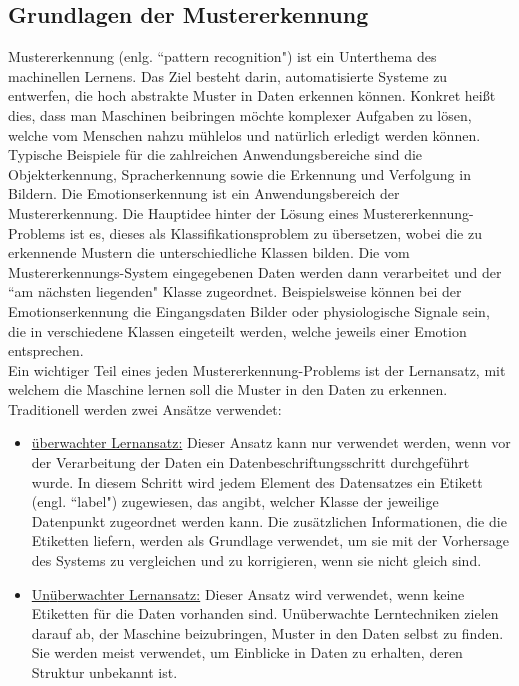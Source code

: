 \subsection{Grundlagen der Mustererkennung} \label{grundlagen-mustererkennung}


Mustererkennung (enlg. ``pattern recognition") ist ein Unterthema des machinellen Lernens.
Das Ziel besteht darin, automatisierte Systeme zu entwerfen, die hoch abstrakte Muster in Daten erkennen k{\"o}nnen.
Konkret hei{\ss}t dies, dass man Maschinen beibringen m{\"o}chte komplexer Aufgaben zu l{\"o}sen, welche vom Menschen nahzu m{\"u}hlelos und nat{\"u}rlich erledigt werden k{\"o}nnen.
Typische Beispiele f{\"u}r die zahlreichen Anwendungsbereiche sind die Objekterkennung, Spracherkennung sowie die Erkennung und Verfolgung in Bildern. 
Die Emotionserkennung ist ein Anwendungsbereich der Mustererkennung.
Die Hauptidee hinter der L{\"o}sung eines Mustererkennung-Problems ist es, dieses als Klassifikationsproblem zu {\"u}bersetzen, wobei die zu erkennende Mustern die unterschiedliche Klassen bilden. 
Die vom Mustererkennungs-System eingegebenen Daten werden dann verarbeitet und der ``am n{\"a}chsten liegenden" Klasse zugeordnet.
Beispielsweise k{\"o}nnen bei der Emotionserkennung die Eingangsdaten Bilder oder physiologische Signale sein, die in verschiedene Klassen eingeteilt werden, welche jeweils einer Emotion entsprechen. \\

Ein wichtiger Teil eines jeden Mustererkennung-Problems ist der Lernansatz, mit welchem die Maschine lernen soll die Muster in den Daten zu erkennen. 
Traditionell werden zwei Ans{\"a}tze verwendet:

\begin{itemize}%
  \item \underline{{\"u}berwachter Lernansatz:}
  Dieser Ansatz kann nur verwendet werden, wenn vor der Verarbeitung der Daten ein Datenbeschriftungsschritt durchgef{\"u}hrt wurde.
  In diesem Schritt wird jedem Element des Datensatzes ein Etikett (engl. ``label") zugewiesen, das angibt, welcher Klasse der jeweilige Datenpunkt zugeordnet werden kann.
  Die zus{\"a}tzlichen Informationen, die die Etiketten liefern, werden als Grundlage verwendet, um sie mit der Vorhersage des Systems zu vergleichen und zu korrigieren, wenn sie nicht gleich sind.

  \item \underline{Un{\"u}berwachter Lernansatz:}
  Dieser Ansatz wird verwendet, wenn keine Etiketten f{\"u}r die Daten vorhanden sind.
  Un{\"u}berwachte Lerntechniken zielen darauf ab, der Maschine beizubringen, Muster in den Daten selbst zu finden. 
  Sie werden meist verwendet, um Einblicke in Daten zu erhalten, deren Struktur unbekannt ist.
\end{itemize} %


